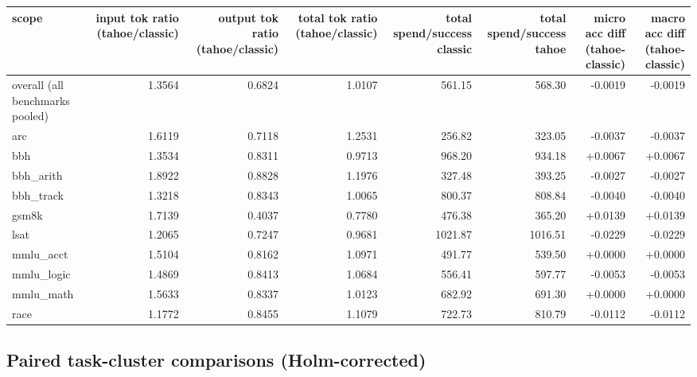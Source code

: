\documentclass[11pt,a4paper]{article}
\begin{document}
\begin{tabular}{@{}l r r r r r r r@{}}
\toprule
scope & input tok ratio (tahoe/classic) & output tok ratio (tahoe/classic) & total tok ratio (tahoe/classic) & total spend/success classic & total spend/success tahoe & micro acc diff (tahoe-classic) & macro acc diff (tahoe-classic) \\
\midrule
overall (all benchmarks pooled) & 1.3564 & 0.6824 & 1.0107 & 561.15 & 568.30 & -0.0019 & -0.0019 \\
arc & 1.6119 & 0.7118 & 1.2531 & 256.82 & 323.05 & -0.0037 & -0.0037 \\
bbh & 1.3534 & 0.8311 & 0.9713 & 968.20 & 934.18 & +0.0067 & +0.0067 \\
bbh\_arith & 1.8922 & 0.8828 & 1.1976 & 327.48 & 393.25 & -0.0027 & -0.0027 \\
bbh\_track & 1.3218 & 0.8343 & 1.0065 & 800.37 & 808.84 & -0.0040 & -0.0040 \\
gsm8k & 1.7139 & 0.4037 & 0.7780 & 476.38 & 365.20 & +0.0139 & +0.0139 \\
lsat & 1.2065 & 0.7247 & 0.9681 & 1021.87 & 1016.51 & -0.0229 & -0.0229 \\
mmlu\_acct & 1.5104 & 0.8162 & 1.0971 & 491.77 & 539.50 & +0.0000 & +0.0000 \\
mmlu\_logic & 1.4869 & 0.8413 & 1.0684 & 556.41 & 597.77 & -0.0053 & -0.0053 \\
mmlu\_math & 1.5633 & 0.8337 & 1.0123 & 682.92 & 691.30 & +0.0000 & +0.0000 \\
race & 1.1772 & 0.8455 & 1.1079 & 722.73 & 810.79 & -0.0112 & -0.0112 \\
\bottomrule
\end{tabular}

\subsection*{Paired task-cluster comparisons (Holm-corrected)}
\end{document}
